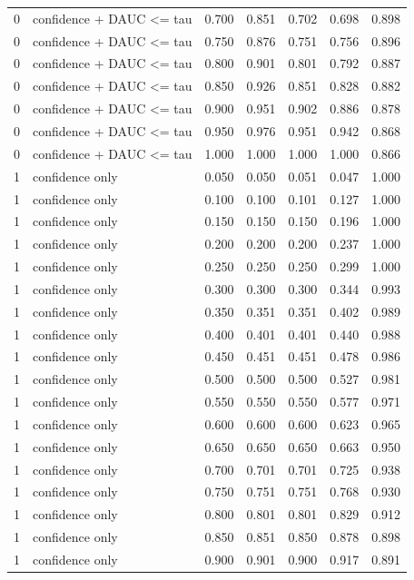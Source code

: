 \begin{tabular}{rlrrrrr}
0 & confidence + DAUC <= tau & 0.700 & 0.851 & 0.702 & 0.698 & 0.898 \\
0 & confidence + DAUC <= tau & 0.750 & 0.876 & 0.751 & 0.756 & 0.896 \\
0 & confidence + DAUC <= tau & 0.800 & 0.901 & 0.801 & 0.792 & 0.887 \\
0 & confidence + DAUC <= tau & 0.850 & 0.926 & 0.851 & 0.828 & 0.882 \\
0 & confidence + DAUC <= tau & 0.900 & 0.951 & 0.902 & 0.886 & 0.878 \\
0 & confidence + DAUC <= tau & 0.950 & 0.976 & 0.951 & 0.942 & 0.868 \\
0 & confidence + DAUC <= tau & 1.000 & 1.000 & 1.000 & 1.000 & 0.866 \\
1 & confidence only & 0.050 & 0.050 & 0.051 & 0.047 & 1.000 \\
1 & confidence only & 0.100 & 0.100 & 0.101 & 0.127 & 1.000 \\
1 & confidence only & 0.150 & 0.150 & 0.150 & 0.196 & 1.000 \\
1 & confidence only & 0.200 & 0.200 & 0.200 & 0.237 & 1.000 \\
1 & confidence only & 0.250 & 0.250 & 0.250 & 0.299 & 1.000 \\
1 & confidence only & 0.300 & 0.300 & 0.300 & 0.344 & 0.993 \\
1 & confidence only & 0.350 & 0.351 & 0.351 & 0.402 & 0.989 \\
1 & confidence only & 0.400 & 0.401 & 0.401 & 0.440 & 0.988 \\
1 & confidence only & 0.450 & 0.451 & 0.451 & 0.478 & 0.986 \\
1 & confidence only & 0.500 & 0.500 & 0.500 & 0.527 & 0.981 \\
1 & confidence only & 0.550 & 0.550 & 0.550 & 0.577 & 0.971 \\
1 & confidence only & 0.600 & 0.600 & 0.600 & 0.623 & 0.965 \\
1 & confidence only & 0.650 & 0.650 & 0.650 & 0.663 & 0.950 \\
1 & confidence only & 0.700 & 0.701 & 0.701 & 0.725 & 0.938 \\
1 & confidence only & 0.750 & 0.751 & 0.751 & 0.768 & 0.930 \\
1 & confidence only & 0.800 & 0.801 & 0.801 & 0.829 & 0.912 \\
1 & confidence only & 0.850 & 0.851 & 0.850 & 0.878 & 0.898 \\
1 & confidence only & 0.900 & 0.901 & 0.900 & 0.917 & 0.891 \\

\end{tabular}
